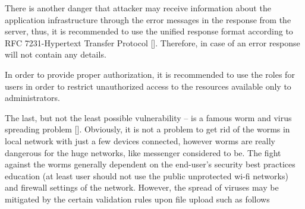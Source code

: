There is another danger that attacker may receive information about the application infrastructure
through the error messages in the response from the server, thus, it is recommended to use the unified
response format according to RFC 7231-Hypertext Transfer Protocol [\cite{fielding2014rfc}].
Therefore, in case of an error response will not contain any details.

In order to provide proper authorization, it is recommended to use the roles for users in order to restrict
unauthorized access to the resources available only to administrators.

The last, but not the least possible vulnerability -- is a famous worm and virus spreading problem [\cite{mannan2005instant}].
Obviously, it is not a problem to get rid of the worms in local network with just a few devices connected,
however worms are really dangerous for the huge networks, like messenger considered to be.
The fight against the worms generally dependent on the end-user's security best practices education (at least user should
not use the public unprotected wi-fi networks) and firewall settings of the network.
However, the spread of viruses may be mitigated by the certain validation rules upon file upload such as follows
